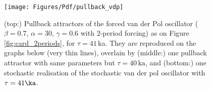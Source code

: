 \begin{figure}
\begin{center}
\texttt{[image: Figures/Pdf/pullback\_vdp]}
\end{center}
\caption
{
(top:) Pullback attractors of the forced van der Pol oscillator
 ($\beta=0.7$, $\alpha=30$, $\gamma=0.6$ with 2-period forcing) as on Figure \ref{fig:card_2periods}, 
 for $\tau=41$\,ka. They are reproduced on the graphs below (very thin lines), overlain by (middle:)  
 one pullback attractor with same parameters but $\tau=40\,\mathrm{ka}$, and
 (bottom:) one stochastic realisation of the stochastic van der pol oscillator with $\tau=41\ka$.
}
\label{fig:pullback_vdp}
\end{figure}
